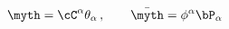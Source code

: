 \begin{equation}
\myth=\cC^\alpha \theta_\alpha\,, \qquad
\bar\myth= \phi^\alpha  \bP_\alpha
\end{equation}

